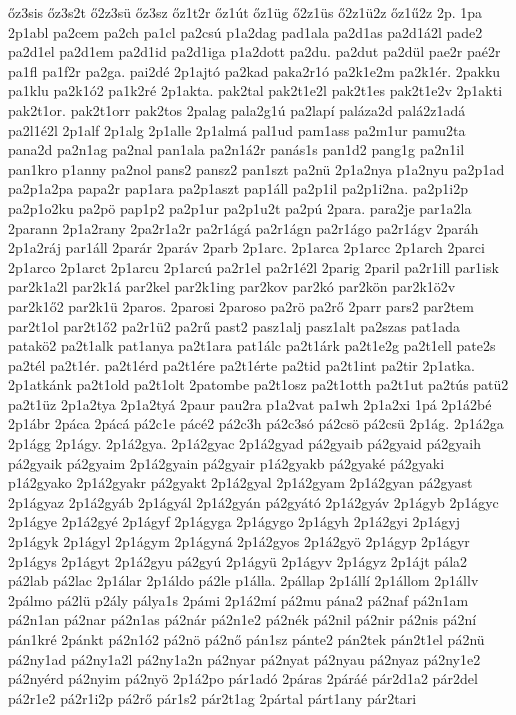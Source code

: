 {őz3sis
őz3s2t
ő2z3sü
őz3sz
őz1t2r
őz1út
őz1üg
ő2z1üs
ő2z1ü2z
őz1ű2z
2p.
1pa
2p1abl
pa2cem
pa2ch
pa1cl
pa2csú
p1a2dag
pad1ala
pa2d1as
pa2d1á2l
pade2
pa2d1el
pa2d1em
pa2d1id
pa2d1iga
p1a2dott
pa2du.
pa2dut
pa2dül
pae2r
paé2r
pa1fl
pa1f2r
pa2ga.
pai2dé
2p1ajtó
pa2kad
paka2r1ó
pa2k1e2m
pa2k1ér.
2pakku
pa1klu
pa2k1ó2
pa1k2ré
2p1akta.
pak2tal
pak2t1e2l
pak2t1es
pak2t1e2v
2p1akti
pak2t1or.
pak2t1orr
pak2tos
2palag
pala2g1ú
pa2lapí
paláza2d
palá2z1adá
pa2l1é2l
2p1alf
2p1alg
2p1alle
2p1almá
pal1ud
pam1ass
pa2m1ur
pamu2ta
pana2d
pa2n1ag
pa2nal
pan1ala
pa2n1á2r
panás1s
pan1d2
pang1g
pa2n1il
pan1kro
p1anny
pa2nol
pans2
pansz2
pan1szt
pa2nü
2p1a2nya
p1a2nyu
pa2p1ad
pa2p1a2pa
papa2r
pap1ara
pa2p1aszt
pap1áll
pa2p1il
pa2p1i2na.
pa2p1i2p
pa2p1o2ku
pa2pö
pap1p2
pa2p1ur
pa2p1u2t
pa2pú
2para.
para2je
par1a2la
2parann
2p1a2rany
2pa2r1a2r
pa2r1ágá
pa2r1ágn
pa2r1ágo
pa2r1ágv
2paráh
2p1a2ráj
par1áll
2parár
2paráv
2parb
2p1arc.
2p1arca
2p1arcc
2p1arch
2parci
2p1arco
2p1arct
2p1arcu
2p1arcú
pa2r1el
pa2r1é2l
2parig
2paril
pa2r1ill
par1isk
par2k1a2l
par2k1á
par2kel
par2k1ing
par2kov
par2kó
par2kön
par2k1ö2v
par2k1ő2
par2k1ü
2paros.
2parosi
2paroso
pa2rö
pa2rő
2parr
pars2
par2tem
par2t1ol
par2t1ő2
pa2r1ü2
pa2rű
past2
pasz1alj
pasz1alt
pa2szas
pat1ada
patakö2
pa2t1alk
pat1anya
pa2t1ara
pat1álc
pa2t1árk
pa2t1e2g
pa2t1ell
pate2s
pa2tél
pa2t1ér.
pa2t1érd
pa2t1ére
pa2t1érte
pa2tid
pa2t1int
pa2tir
2p1atka.
2p1atkánk
pa2t1old
pa2t1olt
2patombe
pa2t1osz
pa2t1otth
pa2t1ut
pa2tús
patü2
pa2t1üz
2p1a2tya
2p1a2tyá
2paur
pau2ra
p1a2vat
pa1wh
2p1a2xi
1pá
2p1á2bé
2p1ábr
2páca
2pácá
pá2c1e
pácé2
pá2c3h
pá2c3só
pá2csö
pá2csü
2p1ág.
2p1á2ga
2p1ágg
2p1ágy.
2p1á2gya.
2p1á2gyac
2p1á2gyad
pá2gyaib
pá2gyaid
pá2gyaih
pá2gyaik
pá2gyaim
2p1á2gyain
pá2gyair
p1á2gyakb
pá2gyaké
pá2gyaki
p1á2gyako
2p1á2gyakr
pá2gyakt
2p1á2gyal
2p1á2gyam
2p1á2gyan
pá2gyast
2p1ágyaz
2p1á2gyáb
2p1ágyál
2p1á2gyán
pá2gyátó
2p1á2gyáv
2p1ágyb
2p1ágyc
2p1ágye
2p1á2gyé
2p1ágyf
2p1ágyga
2p1ágygo
2p1ágyh
2p1á2gyi
2p1ágyj
2p1ágyk
2p1ágyl
2p1ágym
2p1ágyná
2p1á2gyos
2p1á2gyö
2p1ágyp
2p1ágyr
2p1ágys
2p1ágyt
2p1á2gyu
pá2gyú
2p1ágyü
2p1ágyv
2p1ágyz
2p1ájt
pála2
pá2lab
pá2lac
2p1álar
2p1áldo
pá2le
p1álla.
2pállap
2p1állí
2p1állom
2p1állv
2pálmo
pá2lü
p2ály
pálya1s
2pámi
2p1á2mí
pá2mu
pána2
pá2naf
pá2n1am
pá2n1an
pá2nar
pá2n1as
pá2nár
pá2n1e2
pá2nék
pá2nil
pá2nir
pá2nis
pá2ní
pán1kré
2pánkt
pá2n1ó2
pá2nö
pá2nő
pán1sz
pánte2
pán2tek
pán2t1el
pá2nü
pá2ny1ad
pá2ny1a2l
pá2ny1a2n
pá2nyar
pá2nyat
pá2nyau
pá2nyaz
pá2ny1e2
pá2nyérd
pá2nyim
pá2nyö
2p1á2po
pár1adó
2páras
2páráé
pár2d1a2
pár2del
pá2r1e2
pá2r1i2p
pá2rő
pár1s2
pár2t1ag
2pártal
párt1any
pár2tari
}
